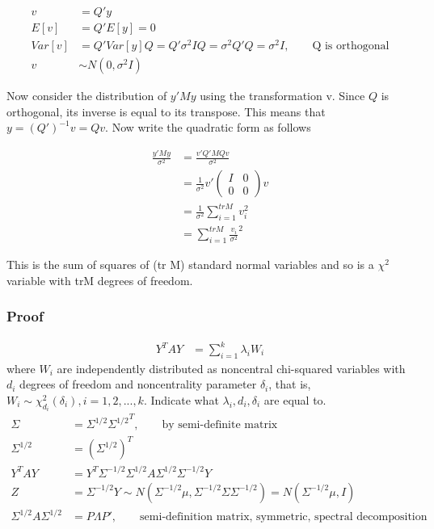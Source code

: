\begin{itemize}
\begin{align*}
	v &= Q'y \\
	E[v] &= Q' E[y] = 0 \\
	Var[v] &= Q' Var[y] Q = Q' \sigma^2 I Q = \sigma^2 Q'Q = \sigma^2 I, \qquad \text{Q is orthogonal} \\
	v & \sim N(0, \sigma^2 I)
\end{align*}	

Now consider the distribution of $y'M y$ using the transformation v. Since $Q$ is orthogonal, its inverse is equal to its transpose. This means that $y= (Q')^{-1} v = Qv$. Now write the quadratic form as follows

\begin{align*}
	\frac{y' M y}{\sigma^2} &= \frac{v' Q' M Q v}{\sigma^2} \\
	&= \frac{1}{\sigma^2} v' \begin{pmatrix}
		I & 0 \\
		0 & 0
	\end{pmatrix} v \\
&= \frac{1}{\sigma^2} \sum_{i=1}^{tr M} v_i^2 \\
&= \sum_{i=1}^{tr M} \frac{v_i}{\sigma^2} ^2
\end{align*}	

This is the sum of squares of (tr M) standard normal variables and so is a $\chi^2$ variable with trM degrees of freedom. 


	\end{itemize}


\subsubsection{Proof}	


	\begin{align*}
		Y^T A Y &= \sum_{i=1}^k \lambda_i W_i     
	\end{align*} 
	where $W_i$ are independently distributed as noncentral chi-squared variables with $d_i$ degrees of freedom and noncentrality parameter $\delta_i$, that is, $W_i \sim \chi^2_{ d_i}(\delta_i), i =
	1, 2, ..., k$. Indicate what $\lambda_i, d_i, \delta_i$ are equal to.\\
	\begin{align*}
		\Sigma &= \Sigma^{1/2} {\Sigma^{1/2}}^T, \qquad \text{by semi-definite matrix}\\
		\Sigma^{1/2}  &= (\Sigma^{1/2} )^T \\
		Y^T A Y &= Y^T \Sigma^{-1/2} \Sigma^{1/2} A \Sigma^{1/2}  \Sigma^{-1/2} Y \\
		Z &= \Sigma^{-1/2} Y \sim N( \Sigma^{-1/2} \mu, \Sigma^{-1/2} \Sigma \Sigma^{-1/2} ) = N( \Sigma^{-1/2} \mu, I ) \\
		\Sigma^{1/2} A \Sigma^{1/2} &= P \Lambda P', \qquad \text{semi-definition matrix, symmetric, spectral decomposition}
	\end{align*} 

